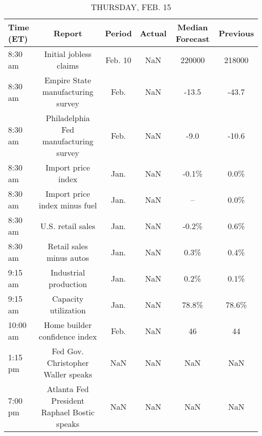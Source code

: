 \documentclass{article}%
\begin{document}
%


\begin{table}[htbp]%
\caption{THURSDAY, FEB. 15}%
\centering%
\begin{adjustbox}{width=1\textwidth}%
\begin{tabular}{lccccc}
\toprule
Time (ET) &                                      Report &  Period & Actual & Median Forecast & Previous \\
\midrule
  8:30 am &                      Initial jobless claims & Feb. 10 &    NaN &          220000 &   218000 \\
  8:30 am &           Empire State manufacturing survey &    Feb. &    NaN &           -13.5 &    -43.7 \\
  8:30 am &       Philadelphia Fed manufacturing survey &    Feb. &    NaN &            -9.0 &    -10.6 \\
  8:30 am &                          Import price index &    Jan. &    NaN &           -0.1\% &     0.0\% \\
  8:30 am &               Import price index minus fuel &    Jan. &    NaN &              -- &     0.0\% \\
  8:30 am &                           U.S. retail sales &    Jan. &    NaN &           -0.2\% &     0.6\% \\
  8:30 am &                    Retail sales minus autos &    Jan. &    NaN &            0.3\% &     0.4\% \\
  9:15 am &                       Industrial production &    Jan. &    NaN &            0.2\% &     0.1\% \\
  9:15 am &                        Capacity utilization &    Jan. &    NaN &           78.8\% &    78.6\% \\
 10:00 am &               Home builder confidence index &    Feb. &    NaN &              46 &       44 \\
  1:15 pm &          Fed Gov. Christopher Waller speaks &     NaN &    NaN &             NaN &      NaN \\
  7:00 pm & Atlanta Fed President Raphael Bostic speaks &     NaN &    NaN &             NaN &      NaN \\
\bottomrule
\end{tabular}
%
\end{adjustbox}%
\end{table}

%
\end{document}
